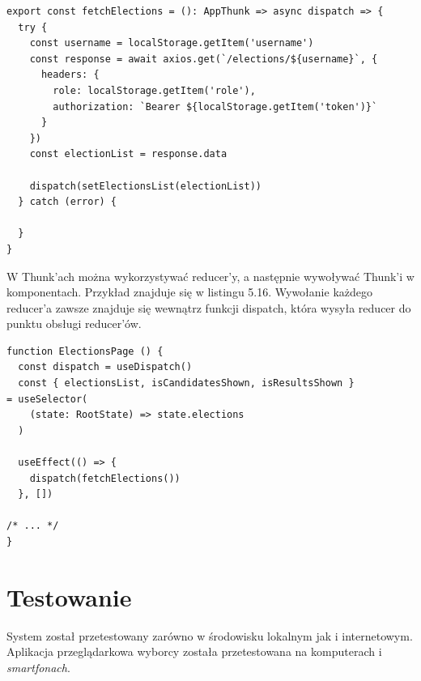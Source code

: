\documentclass[a4paper,12pt]{book}
\begin{document}
\begin{lstlisting}[style=ES6, caption={Thunk \textit{fetchElection}.}]
export const fetchElections = (): AppThunk => async dispatch => {
  try {
    const username = localStorage.getItem('username')
    const response = await axios.get(`/elections/${username}`, {
      headers: {
        role: localStorage.getItem('role'),
        authorization: `Bearer ${localStorage.getItem('token')}`
      }
    })
    const electionList = response.data

    dispatch(setElectionsList(electionList))
  } catch (error) {

  }
}
\end{lstlisting}

 W Thunk'ach można wykorzystywać reducer'y, a następnie wywoływać Thunk'i w komponentach. Przykład znajduje się w listingu 5.16. Wywołanie każdego reducer'a zawsze znajduje się wewnątrz funkcji dispatch, która wysyła reducer do punktu obsługi reducer'ów.

\begin{lstlisting}[style=ES6, caption={Wykorzystanie Thunk'a, w komponencie \textit{ElectionsPage}.}]
function ElectionsPage () {
  const dispatch = useDispatch()
  const { electionsList, isCandidatesShown, isResultsShown } 
= useSelector(
    (state: RootState) => state.elections
  )

  useEffect(() => {
    dispatch(fetchElections())
  }, [])

/* ... */
}
\end{lstlisting}

\chapter{Testowanie}

System został przetestowany zarówno w środowisku lokalnym jak i internetowym. Aplikacja przeglądarkowa wyborcy została przetestowana na komputerach i \textit{smartfonach}.
\end{document}
